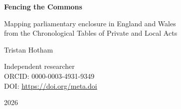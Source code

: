 \documentclass[11pt,a4paper]{article}
\begin{document}
\begin{center}
{\Large\bfseries Fencing the Commons\par}
\vspace{0.4em}
{\large Mapping parliamentary enclosure in England and Wales\\from the Chronological Tables of Private and Local Acts\par}
\vspace{1.2em}
{\large Tristan Hotham\par}
\vspace{0.3em}
{\small Independent researcher\\
ORCID: 0000-0003-4931-9349\\
DOI: \href{https://doi.org/{{meta.doi}}}{https://doi.org/{{meta.doi}}}\par}
\vspace{0.8em}
2026
\end{center}
\end{document}
